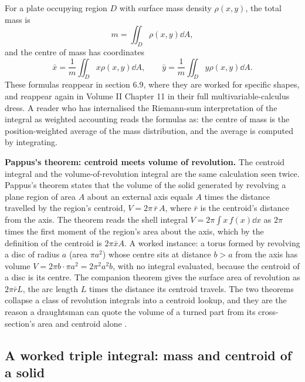 For a plate occupying region $D$ with surface mass density
$\rho(x, y)$, the total mass is
\[
m = \iint_{D} \rho(x, y) \dd A,
\]
and the centre of mass has coordinates
\[
\bar{x} = \frac{1}{m}\iint_{D} x \rho(x,y) \dd A, \qquad
\bar{y} = \frac{1}{m}\iint_{D} y \rho(x,y) \dd A.
\]
These formulas reappear in section 6.9, where they are worked for
specific shapes, and reappear again in Volume II Chapter 11 in
their full multivariable-calculus dress. A reader who has
internalised the Riemann-sum interpretation of the integral as
weighted accounting reads the formulas as: the centre of mass is
the position-weighted average of the mass distribution, and the
average is computed by integrating.

\begin{mastery}
\textbf{Pappus's theorem: centroid meets volume of revolution.}
The centroid integral and the volume-of-revolution integral are the
same calculation seen twice. Pappus's theorem states that the volume
of the solid generated by revolving a plane region of area $A$ about
an external axis equals $A$ times the distance travelled by the
region's centroid, $V = 2\pi\,\bar{r}\,A$, where $\bar{r}$ is the
centroid's distance from the axis. The theorem reads the shell
integral $V = 2\pi\int x\,f(x)\dd x$ as $2\pi$ times the first
moment of the region's area about the axis, which by the definition
of the centroid is $2\pi\bar{x}A$. A worked instance: a torus formed
by revolving a disc of radius $a$ (area $\pi a^{2}$) whose centre
sits at distance $b > a$ from the axis has volume $V = 2\pi b \cdot
\pi a^{2} = 2\pi^{2} a^{2} b$, with no integral evaluated, because
the centroid of a disc is its centre. The companion theorem gives
the surface area of revolution as $2\pi\bar{r}L$, the arc length $L$
times the distance its centroid travels. The two theorems collapse a
class of revolution integrals into a centroid lookup, and they are
the reason a draughtsman can quote the volume of a turned part from
its cross-section's area and centroid alone \cite{text:strang2016}.
\end{mastery}

\subsection{A worked triple integral: mass and centroid of a solid}

